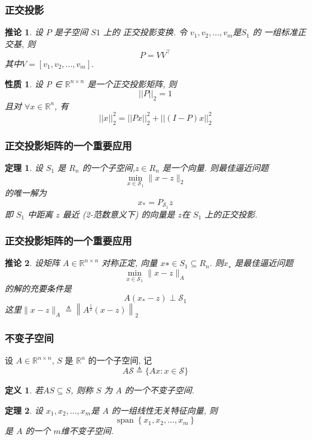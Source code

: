 \documentclass[notheorems,serif]{beamer}
\newcommand{\hei}[1]{{\HEI#1}}
\newtheorem{theorem}{\hei{定理}}
\newtheorem{definition}{\hei{定义}}
\newtheorem{property}{\hei{性质}}
\newtheorem{corollary}{\hei{推论}}
\begin{document}
\begin{frame}
\frametitle{正交投影}

\begin{corollary}
	设 $P$ 是子空间 $S1$ 上的 正交投影变换. 令 $v_1, v_2, . . . , v_m $是$ S_1$ 的
	一组标准正交基, 则
	$$
	P=V V^{\top}
	$$
	其中$ V = [v_1, v_2, . . . , v_m].$
\end{corollary}
\begin{property}
	设 P ∈ $\mathbb{R}^{n×n}$ 是一个正交投影矩阵, 则
	$$
	||P||_{2}=1
	$$
	且对 $∀ x ∈ \mathbb{R}^n$, 有
	$$
	||x||_{2}^{2}=||P x||_{2}^{2}+||(I-P) x||_{2}^{2}
	$$
\end{property}
\end{frame}

\begin{frame}
\frametitle{正交投影矩阵的一个重要应用}

\begin{theorem}
	设 $S_1$ 是 $R_n$ 的一个子空间,$ z ∈ R_n$ 是一个向量. 则最佳逼近问题
	$$
	\min _{x \in \mathcal{S}_{1}}\|x-z\|_{2}
	$$
	的唯一解为
	$$
	x_{*}=P_{\mathcal{S}_{1}} z
	$$
	即 $S_1$ 中距离 $z$ 最近 (2-范数意义下) 的向量是 $z $在 $S
	_1$ 上的正交投影.
\end{theorem}
\end{frame}

\begin{frame}
\frametitle{正交投影矩阵的一个重要应用}

\begin{corollary}
	设矩阵 $A ∈ \mathbb{R}^{n×n}$ 对称正定, 向量 $x∗ ∈ S_1 ⊆ R_n.$ 则$ x_∗$ 是最佳逼近问题
	$$
	\min _{x \in \mathcal{S}_{1}}\|x-z\|_{A}
	$$
	的解的充要条件是
	$$
	A\left(x_{*}-z\right) \perp \mathcal{S}_{1}
	$$
	这里$\|x-z\|_{A} \triangleq\left\|A^{\frac{1}{2}}(x-z)\right\|_{2}$
\end{corollary}
\end{frame}

\begin{frame}
\frametitle{不变子空间}

设 $A ∈ \mathbb{R}^{n×n}$, $S$ 是 $\mathbb{R}^n$ 的一个子空间, 记
$$
A \mathcal{S} \triangleq\{A x : x \in \mathcal{S}\}
$$

\begin{definition}
	若$ AS ⊆ S$, 则称 $S$ 为 $A$ 的一个不变子空间.	
\end{definition}



\begin{theorem}
	设 $x_1, x_2, . . . , x_m $是 $A$ 的一组线性无关特征向量, 则
	$$
	\operatorname{span}\left\{x_{1}, x_{2}, \ldots, x_{m}\right\}
	$$
	是 $A$ 的一个 $m $维不变子空间.
\end{theorem}
\end{frame}
\end{document}
